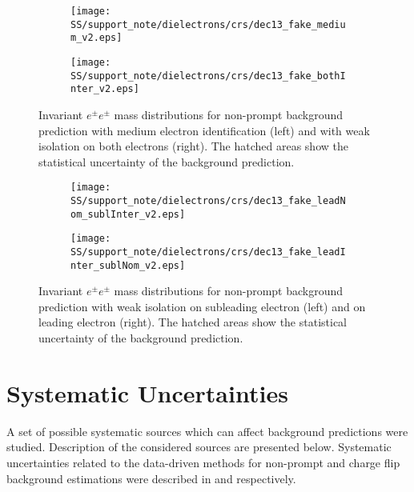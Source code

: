\begin{figure}
\begin{subfigure}{.5\textwidth}
  \centering
  \texttt{[image: SS/support\_note/dielectrons/crs/dec13\_fake\_medium\_v2.eps]}
\end{subfigure}%
\begin{subfigure}{.5\textwidth}
  \centering
  \texttt{[image: SS/support\_note/dielectrons/crs/dec13\_fake\_bothInter\_v2.eps]}
\end{subfigure}
\caption{Invariant $e^{\pm}e^{\pm}$ mass distributions for non-prompt background prediction with medium electron identification (left) and with weak isolation on both electrons (right).
The hatched areas show the statistical uncertainty of the background prediction.}
  \label{fig:fakeCR_part1}
\end{figure}

\begin{figure}
\begin{subfigure}{.5\textwidth}
  \centering
  \texttt{[image: SS/support\_note/dielectrons/crs/dec13\_fake\_leadNom\_sublInter\_v2.eps]}
\end{subfigure}%
\begin{subfigure}{.5\textwidth}
  \centering
  \texttt{[image: SS/support\_note/dielectrons/crs/dec13\_fake\_leadInter\_sublNom\_v2.eps]}
\end{subfigure}
\caption{Invariant $e^{\pm}e^{\pm}$ mass distributions for non-prompt background prediction with weak isolation on subleading electron (left) and on leading electron (right).
The hatched areas show the statistical uncertainty of the background prediction.}
  \label{fig:fakeCR_part2}
\end{figure}



\section{Systematic Uncertainties}
\label{sec:ss_Systematics}

A set of possible systematic sources which can affect background predictions were studied.
Description of the considered sources are presented below.
Systematic uncertainties related to the data-driven methods for non-prompt and charge flip background estimations
were described in  and  respectively.

